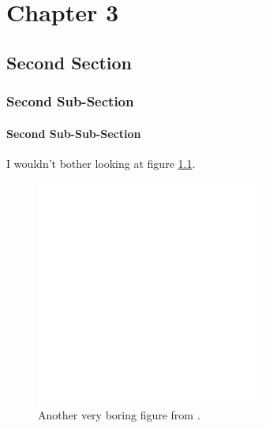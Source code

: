 \pagestyle{fancy}


\chapter{Chapter 3}


\section{Second Section}


\subsection{Second Sub-Section}


\subsubsection{Second Sub-Sub-Section}

I wouldn't bother looking at figure \ref{fig:very_dull_again}.

\begin{figure}[b]
\begin{center}
\includegraphics*[scale=1.0]{chap2/temp.eps}
\end{center}
\caption[Another dull figure.]{Another very boring figure from \citet{lukeabraham.com}.} 
\label{fig:very_dull_again}
\end{figure}

